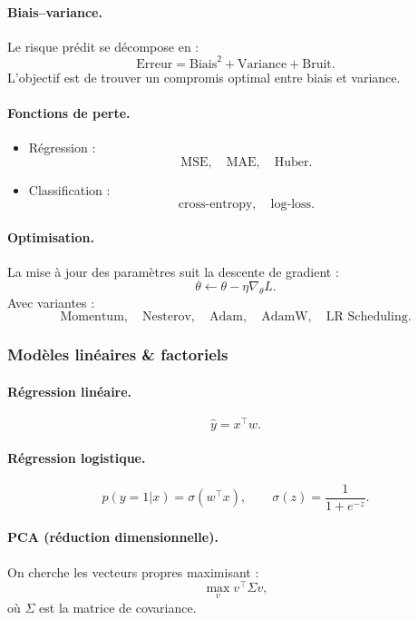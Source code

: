 \documentclass[11pt,a4paper]{article}
\newcommand{\1}{\mathbf{1}}
\begin{document}
\paragraph{Biais--variance.}

Le risque prédit se décompose en :
\[
\text{Erreur} = \text{Biais}^2 + \text{Variance} + \text{Bruit}.
\]
L'objectif est de trouver un compromis optimal entre biais et variance.

\paragraph{Fonctions de perte.}

\begin{itemize}
  \item Régression :
  \[
    \text{MSE},\quad \text{MAE},\quad \text{Huber}.
  \]
  \item Classification :
  \[
    \text{cross-entropy},\quad \text{log-loss}.
  \]
\end{itemize}

\paragraph{Optimisation.}

La mise à jour des paramètres suit la descente de gradient :
\[
\theta \leftarrow \theta - \eta \nabla_\theta L.
\]
Avec variantes :
\[
\text{Momentum},\quad \text{Nesterov},\quad \text{Adam},\quad \text{AdamW},
\quad \text{LR Scheduling}.
\]

\subsubsection{Modèles linéaires \& factoriels}

\paragraph{Régression linéaire.}
\[
\hat y = x^\top w.
\]

\paragraph{Régression logistique.}
\[
p(y=1|x) = \sigma(w^\top x),
\qquad
\sigma(z) = \frac{1}{1+e^{-z}}.
\]

\paragraph{PCA (réduction dimensionnelle).}
On cherche les vecteurs propres maximisant :
\[
\max_v v^\top \Sigma v,
\]
où $\Sigma$ est la matrice de covariance.
\end{document}
